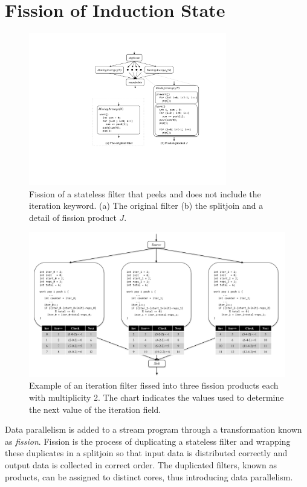 \section{Fission of Induction State}
\label{sec:fission}

\begin{figure}[t!]
\centering
\includegraphics[width=3.4in]{figures/peeking-fission.pdf}
\caption{Fission of a stateless filter that peeks and does not include
  the iteration keyword. (a) The original filter (b) the splitjoin
  and a detail of fission product $J$. \protect\label{fig:duplicate-fission-example}}
\end{figure}


\begin{figure}[t!]
\centering
\includegraphics[width=6.5in]{figures/fission-example.pdf}
\caption{Example of an iteration filter fissed into three fission products each with multiplicity 2.  The chart indicates the values used to determine the next value of the iteration field.  
\protect\label{fig:fission-example}}
\end{figure}

Data parallelism is added to a stream program through a transformation
known as {\it fission}. Fission is the process of duplicating a
stateless filter and wrapping these duplicates in a splitjoin so that
input data is distributed correctly and output data is collected in
correct order. The duplicated filters, known as products, can be
assigned to distinct cores, thus introducing data parallelism.

